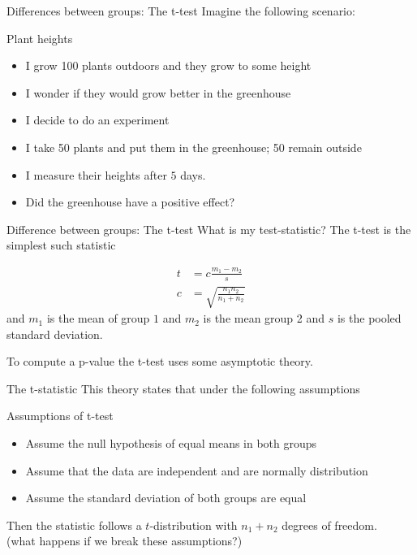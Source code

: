 \documentclass{bredelebeamer}
\begin{document}
\begin{frame}{Differences between groups: The t-test}
Imagine the following scenario:
\begin{block}{Plant heights}
	\begin{itemize}
		\item I grow 100 plants outdoors and they grow to some height
		\item I wonder if they would grow better in the greenhouse
		\item I decide to do an experiment
		\item I take 50 plants and put them in the greenhouse; 50 remain outside
		\item I measure their heights after $5$ days.
		\item Did the greenhouse have a positive effect?
	\end{itemize}

\end{block}
\end{frame}

\begin{frame}{Difference between groups: The t-test}
What is my test-statistic? The t-test is the simplest such statistic

\begin{align}
t &= c\frac{m_1 - m_2}{s} \\
c & = \sqrt{\frac{n_1 n_2}{n_1 + n_2}}
\end{align}
and $m_1$ is the mean of group $1$ and $m_2$ is the mean group 2 and $s$ is the pooled standard deviation.

To compute a p-value the t-test uses some asymptotic theory.  
\end{frame}


\begin{frame}{The t-statistic}
This theory states that under the following assumptions
\begin{block}{Assumptions of t-test}

\begin{itemize}
	\item Assume the null hypothesis of equal means in both groups
\item Assume that the data are independent and are normally distribution
\item Assume the standard deviation of both groups are equal
\end{itemize}

\end{block}
Then the statistic follows a $t$-distribution with $n_1 + n_2$ degrees of freedom.
\\
(what happens if we break these assumptions?)
\end{frame}
\end{document}
